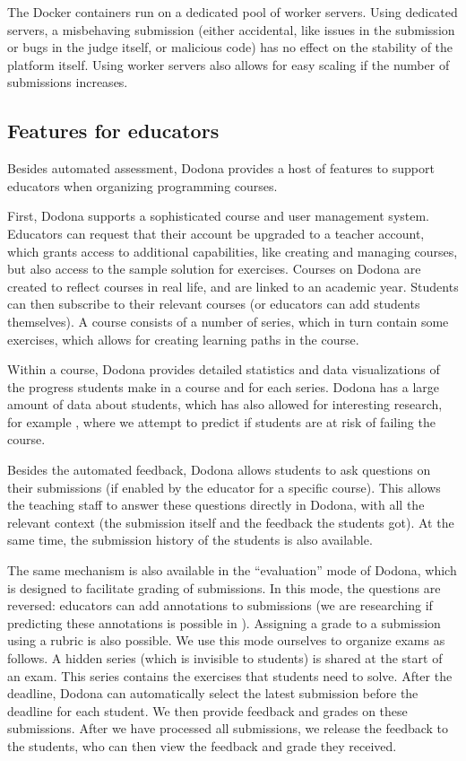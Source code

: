 \documentclass[../main]{subfiles}
\begin{document}
The Docker containers run on a dedicated pool of worker servers.
Using dedicated servers, a misbehaving submission (either accidental, like issues in the submission or bugs in the judge itself, or malicious code) has no effect on the stability of the platform itself.
Using worker servers also allows for easy scaling if the number of submissions increases.

\subsection{Features for educators}\label{subsec:features-for-educators}

Besides automated assessment, Dodona provides a host of features to support educators when organizing programming courses.

First, Dodona supports a sophisticated course and user management system.
Educators can request that their account be upgraded to a teacher account, which grants access to additional capabilities, like creating and managing courses, but also access to the sample solution for exercises.
Courses on Dodona are created to reflect courses in real life, and are linked to an academic year.
Students can then subscribe to their relevant courses (or educators can add students themselves).
A course consists of a number of series, which in turn contain some exercises, which allows for creating learning paths in the course.

Within a course, Dodona provides detailed statistics and data visualizations of the progress students make in a course and for each series.
Dodona has a large amount of data about students, which has also allowed for interesting research, for example \textcite{vanpetegemPassFailPrediction2023}, where we attempt to predict if students are at risk of failing the course.

Besides the automated feedback, Dodona allows students to ask questions on their submissions (if enabled by the educator for a specific course).
This allows the teaching staff to answer these questions directly in Dodona, with all the relevant context (the submission itself and the feedback the students got).
At the same time, the submission history of the students is also available.

The same mechanism is also available in the ``evaluation'' mode of Dodona, which is designed to facilitate grading of submissions.
In this mode, the questions are reversed: educators can add annotations to submissions (we are researching if predicting these annotations is possible in \textcite{vanpetegemMiningPatternsSyntax2024}).
Assigning a grade to a submission using a rubric is also possible.
We use this mode ourselves to organize exams as follows.
A hidden series (which is invisible to students) is shared at the start of an exam.
This series contains the exercises that students need to solve.
After the deadline, Dodona can automatically select the latest submission before the deadline for each student.
We then provide feedback and grades on these submissions.
After we have processed all submissions, we release the feedback to the students, who can then view the feedback and grade they received.
\end{document}
